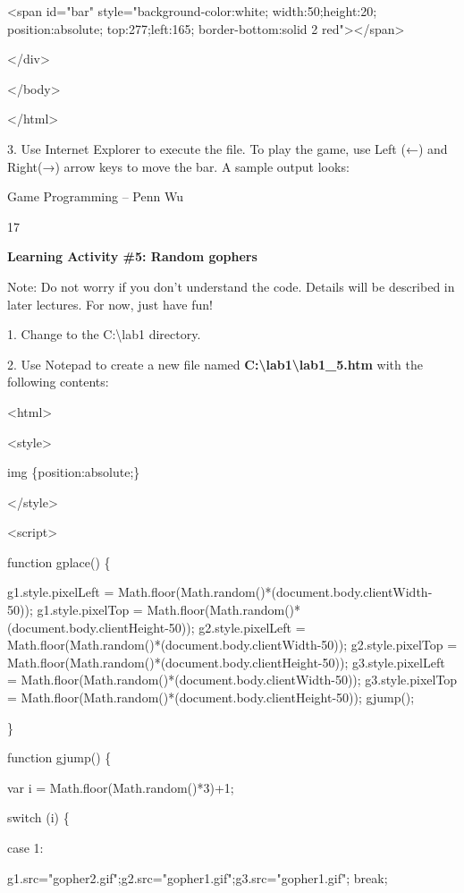 \documentclass[
]{article}
\begin{document}
\textless span id="bar" style="background-color:white;
width:50;height:20; position:absolute; top:277;left:165;
border-bottom:solid 2 red"\textgreater\textless/span\textgreater{}

\textless/div\textgreater{}

\textless/body\textgreater{}

\textless/html\textgreater{}

3. Use Internet Explorer to execute the file. To play the game, use Left
(←) and Right(→) arrow keys to move the bar. A sample output looks:

Game Programming -- Penn Wu

17

\protect\hypertarget{index_split_002.htmlux5cux23p18}{}{}\textbf{Learning
Activity \#5: Random gophers}

Note: Do not worry if you don't understand the code. Details will be
described in later lectures. For now, just have fun!

1. Change to the C:\textbackslash lab1 directory.

2. Use Notepad to create a new file named
\textbf{C:\textbackslash lab1\textbackslash lab1\_5.htm} with the
following contents:

\textless html\textgreater{}

\textless style\textgreater{}

img \{position:absolute;\}

\textless/style\textgreater{}

\textless script\textgreater{}

function gplace() \{

g1.style.pixelLeft =
Math.floor(Math.random()*(document.body.clientWidth-50));
g1.style.pixelTop =
Math.floor(Math.random()*(document.body.clientHeight-50));
g2.style.pixelLeft =
Math.floor(Math.random()*(document.body.clientWidth-50));
g2.style.pixelTop =
Math.floor(Math.random()*(document.body.clientHeight-50));
g3.style.pixelLeft =
Math.floor(Math.random()*(document.body.clientWidth-50));
g3.style.pixelTop =
Math.floor(Math.random()*(document.body.clientHeight-50)); gjump();

\}

function gjump() \{

var i = Math.floor(Math.random()*3)+1;

switch (i) \{

case 1:

g1.src="gopher2.gif";g2.src="gopher1.gif";g3.src="gopher1.gif"; break;
\end{document}
